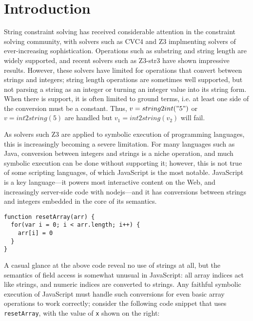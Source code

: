 \documentclass[sigplan,review,anonymous]{acmart}\settopmatter{printfolios=true,printccs=false,printacmref=false}
\begin{document}
\section{Introduction} \label{section:introduction}



String constraint solving has received considerable attention in the constraint solving community, with solvers such as CVC4 and Z3 implmenting solvers of ever-increasing sophistication.  Operations such as substring and string length are widely supported, and recent solvers such as Z3-str3 have shown impressive results.  However, these solvers have limited for operations that convert between strings and integers; string length operations are sometimes well supported, but not parsing a string as an integer or turning an integer value into its string form.  When there is support, it is often limited to ground terms, i.e. at least one side of the conversion must be a constant.  Thus, $v = string2int("5")$ or $v = int2string(5)$ are handled but $v_1 = int2string(v_2)$ will fail.

As solvers such Z3 are applied to symbolic execution of programming languages, this is increasingly becoming a severe limitation.  For many languages such as Java, conversion between integers and strings is a niche operation, and much symbolic execution can be done without supporting it; however, this is not true of some scripting languages, of which JavaScript is the most notable.  JavaScript is a key language---it powers most interactive content on the Web, and increasingly server-side code with nodejs---and it has conversions between strings and integers embedded in the core of its semantics.

\begin{verbatim}
function resetArray(arr) {
  for(var i = 0; i < arr.length; i++) {
    arr[i] = 0
  }
}
\end{verbatim}



A casual glance at the above code reveal no use of strings at all, but the semantics of field access is somewhat unusual in JavaScript: all array indices act like strings, and numeric indices are converted to strings.  Any faithful symbolic execution of JavaScript must handle such conversions for even basic array operations to work correctly; consider the following code snippet that uses {\tt{resetArray}}, with the value of {\tt{x}} shown on the right:
\end{document}
